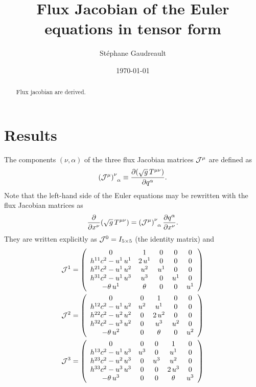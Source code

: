 \documentclass[12pt]{article}
\title{Flux Jacobian of the Euler equations in tensor form}
\author{Stéphane Gaudreault}
\date{\today}
\begin{document}
\maketitle

\begin{abstract}
Flux jacobian are derived.
\end{abstract}

\section{Results}

The components $(\nu,\alpha)$ of the three flux Jacobian matrices ${\cal J}^\mu$ are defined as
\begin{align}
\left( {\cal J}^\mu \right)^\nu_{\;\;\alpha}\equiv \frac{\partial (\sqrt{g}\,T^{\mu\nu})}{\partial q^\alpha}.
\end{align}
Note that the left-hand side of the Euler equations may be rewritten with the flux Jacobian matrices as
\begin{align}
\frac{\partial}{\partial x^\nu}(\sqrt{g}\,T^{\mu\nu})=\left( {\cal J}^\mu \right)^\nu_{\;\;\alpha} \frac{\partial q^\alpha}{\partial x^\nu}.
\end{align}
They are written explicitly as ${\cal J}^0=I_{5\times 5}$ (the identity matrix) and
\begin{align}
{\cal J}^1=\left(\begin{array}{ccccc} 0 & 1 & 0 & 0 & 0\\ h^{11} c^2 -u^{1}\,u^{1} & 2\,u^{1} & 0 & 0 & 0\\ h^{21} c^2 -u^{1}\,u^{2} & u^{2} & u^{1} & 0 & 0\\ h^{31} c^2 -u^{1}\,u^{3} & u^{3} & 0 & u^{1} & 0\\ -\theta \,u^{1} & \theta  & 0 & 0 & u^{1} \end{array}\right) \\
{\cal J}^2=\left(\begin{array}{ccccc} 0 & 0 & 1 & 0 & 0\\ h^{12} c^2-u^{1}\,u^{2} & u^{2} & u^{1} & 0 & 0\\ h^{22} c^2 - u^{2}\,u^{2} & 0 & 2\,u^{2} & 0 & 0\\ h^{32} c^2 - u^{3}\,u^{2} & 0 & u^{3} & u^{2} & 0\\ -\theta \,u^{2} & 0 & \theta  & 0 & u^{2} \end{array}\right)\\
{\cal J}^3=\left(\begin{array}{ccccc} 0 & 0 & 0 & 1 & 0\\ h^{13} c^2 -u^{1}\,u^{3} & u^{3} & 0 & u^{1} & 0\\ h^{23} c^2 -u^{2}\,u^{3} & 0 & u^{3} & u^{2} & 0\\ h^{33} c^2 - u^{3}\,u^{3} & 0 & 0 & 2\,u^{3} & 0\\ -\theta \,u^{3} & 0 & 0 & \theta  & u^{3} \end{array}\right)
\end{align}
\end{document}
